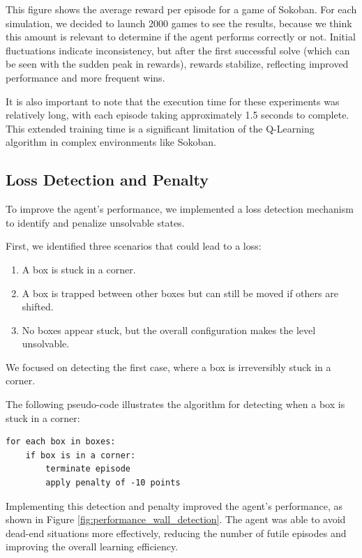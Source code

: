 \documentclass[10pt,twocolumn]{article}
\begin{document}
This figure shows the average reward per episode for a game of Sokoban. For each simulation, we decided to launch 2000 games to see the results, because we think this amount is relevant to determine if the agent performs correctly or not. Initial fluctuations indicate inconsistency, but after the first successful solve (which can be seen with the sudden peak in rewards), rewards stabilize, reflecting improved performance and more frequent wins.

It is also important to note that the execution time for these experiments was relatively long, with each episode taking approximately 1.5 seconds to complete. This extended training time is a significant limitation of the Q-Learning algorithm in complex environments like Sokoban.

\subsection{Loss Detection and Penalty}

To improve the agent's performance, we implemented a loss detection mechanism to identify and penalize unsolvable states.

First, we identified three scenarios that could lead to a loss:
\begin{enumerate}
    \item A box is stuck in a corner.
    \item A box is trapped between other boxes but can still be moved if others are shifted.
    \item No boxes appear stuck, but the overall configuration makes the level unsolvable.
\end{enumerate}

We focused on detecting the first case, where a box is irreversibly stuck in a corner.

The following pseudo-code illustrates the algorithm for detecting when a box is stuck in a corner:

\begin{verbatim}
for each box in boxes:
    if box is in a corner:
        terminate episode
        apply penalty of -10 points
\end{verbatim}

Implementing this detection and penalty improved the agent's performance, as shown in Figure \ref{fig:performance_wall_detection}. The agent was able to avoid dead-end situations more effectively, reducing the number of futile episodes and improving the overall learning efficiency.
\end{document}
